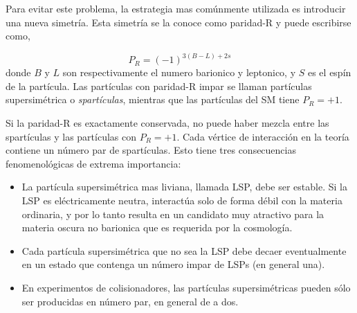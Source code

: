 Para evitar este problema, la estrategia mas comúnmente utilizada es
introducir una nueva simetría. Esta simetría se la conoce como
paridad-R y puede escribirse como,

\begin{equation}
  P_R = (-1)^{3(B-L)+ 2s}
\end{equation}
%
donde $B$ y $L$ son respectivamente el numero barionico y leptonico, y
$S$ es el espín de la partícula. Las partículas con paridad-R impar se
llaman partículas supersimétrica o \emph{spartículas}, mientras que
las partículas del SM tiene $P_R = +1$.

Si la paridad-R es exactamente conservada, no puede haber mezcla entre
las spartículas y las partículas con $P_R = +1$. Cada vértice de
interacción en la teoría contiene un número par de spartículas. Esto
tiene tres consecuencias fenomenológicas de extrema importancia:

\begin{itemize}
\item La partícula supersimétrica mas liviana, llamada LSP, debe ser
  estable. Si la LSP es eléctricamente neutra, interactúa solo de
  forma débil con la materia ordinaria, y por lo tanto resulta en un
  candidato muy atractivo para la materia oscura no barionica que es
  requerida por la cosmología.
\item Cada partícula supersimétrica que no sea la LSP debe decaer
  eventualmente en un estado que contenga un número impar de LSPs (en
  general una).
\item En experimentos de colisionadores, las partículas
  supersimétricas pueden sólo ser producidas en número par, en general
  de a dos.
\end{itemize}






